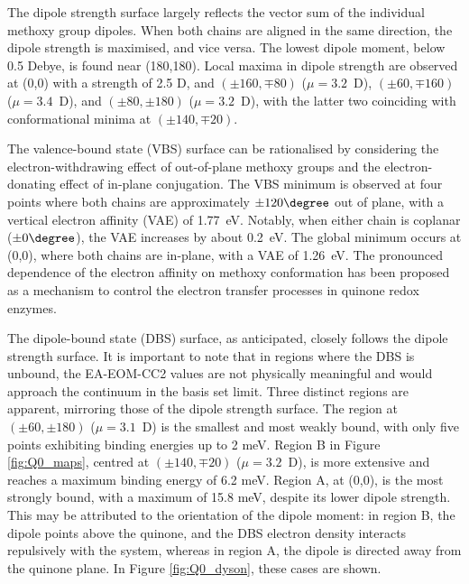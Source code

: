 The dipole strength surface largely reflects the vector sum of the individual methoxy group dipoles. When both chains are aligned in the same direction, the dipole strength is maximised, and vice versa. The lowest dipole moment, below 0.5 Debye, is found near (180,180). Local maxima in dipole strength are observed at (0,0) with a strength of 2.5 D, and $\mathrm{(\pm160,\mp80)}$ ($\mu=3.2$~D), $\mathrm{(\pm60,\mp160)}$ ($\mu=3.4$~D), and $\mathrm{(\pm80,\pm180)}$ ($\mu=3.2$~D), with the latter two coinciding with conformational minima at $\mathrm{(\pm140,\mp20)}$.

The valence-bound state (VBS) surface can be rationalised by considering the electron-withdrawing effect of out-of-plane methoxy groups and the electron-donating effect of in-plane conjugation. The VBS minimum is observed at four points where both chains are approximately $\pm120\degree$ out of plane, with a vertical electron affinity (VAE) of 1.77~eV. Notably, when either chain is coplanar ($\pm0\degree$), the VAE increases by about 0.2~eV. The global minimum occurs at (0,0), where both chains are in-plane, with a VAE of 1.26~eV. The pronounced dependence of the electron affinity on methoxy conformation has been proposed as a mechanism to control the electron transfer processes in quinone redox enzymes\cite{schulz2018systematic,nonella1998quantum,taguchi2013tuning,taguchi2013conformational,deAlmeida2014effect}.\label{sec:Q0_maps}

The dipole-bound state (DBS) surface, as anticipated, closely follows the dipole strength surface. It is important to note that in regions where the DBS is unbound, the EA-EOM-CC2 values are not physically meaningful and would approach the continuum in the basis set limit. Three distinct regions are apparent, mirroring those of the dipole strength surface. The region at $\mathrm{(\pm60,\pm180)}$ ($\mu=3.1$~D) is the smallest and most weakly bound, with only five points exhibiting binding energies up to 2 meV. Region B in Figure \ref{fig:Q0_maps}, centred at $\mathrm{(\pm140,\mp20)}$ ($\mu=3.2$~D), is more extensive and reaches a maximum binding energy of 6.2 meV. Region A, at (0,0), is the most strongly bound, with a maximum of 15.8 meV, despite its lower dipole strength. This may be attributed to the orientation of the dipole moment: in region B, the dipole points above the quinone, and the DBS electron density  interacts repulsively with the \textpi system, whereas in region A, the dipole is directed away from the quinone plane. In Figure \ref{fig:Q0_dyson}, these cases are shown. 

